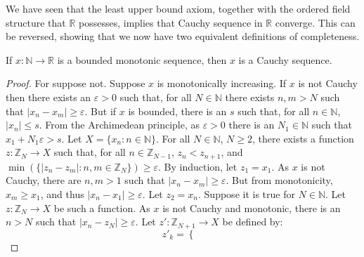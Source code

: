             We have seen that the least upper bound axiom,
            together with the ordered field structure that
            $\mathbb{R}$ possesses, implies that
            Cauchy sequence in $\mathbb{R}$ converge. This can
            be reversed, showing that we now have two equivalent
            definitions of completeness.
            \begin{theorem}
                If $x:\mathbb{N}\rightarrow\mathbb{R}$
                is a bounded monotonic sequence, then
                $x$ is a Cauchy sequence.
            \end{theorem}
            \begin{proof}
                For suppose not. Suppose $x$ is monotonically
                increasing. If $x$ is not Cauchy
                then there exists an $\varepsilon>0$ such
                that, for all $N\in\mathbb{N}$ there exists
                $n,m>N$ such that
                $|x_{n}-x_{m}|\geq\varepsilon$. But if
                $x$ is bounded, there is an $s$ such that,
                for all $n\in\mathbb{N}$, $|x_{n}|\leq{s}$.
                From the Archimedean principle, as
                $\varepsilon>0$ there is an $N_{1}\in\mathbb{N}$
                such that $x_{1}+N_{1}\varepsilon>s$.
                Let $X=\{x_{n}:n\in\mathbb{N}\}$.
                For all $N\in\mathbb{N}$, $N\geq{2}$,
                there exists a function
                $z:\mathbb{Z}_{N}\rightarrow{X}$ such that, for
                all $n\in\mathbb{Z}_{N-1}$,
                $z_{n}<z_{n+1}$, and
                $\min(\{|z_{n}-z_{m}|:n,m\in\mathbb{Z}_{N}\})%
                 \geq\varepsilon$. By induction,
                let $z_{1}=x_{1}$. As $x$ is not Cauchy, there
                are $n,m>1$ such that
                $|x_{n}-x_{m}|\geq\varepsilon$. But from
                monotonicity, $x_{m}\geq{x}_{1}$, and thus
                $|x_{n}-x_{1}|\geq\varepsilon$.
                Let $z_{2}=x_{n}$. Suppose it is true for
                $N\in\mathbb{N}$. Let
                $z:\mathbb{Z}_{N}\rightarrow{X}$ be such a
                function. As $x$ is not Cauchy and
                monotonic, there is an $n>N$ such that
                $|x_{n}-z_{N}|\geq\varepsilon$.
                Let $z':\mathbb{Z}_{N+1}\rightarrow{X}$
                be defined by:
                \begin{subequations}
                    \begin{equation}
                        z'_{k}=
                        \begin{cases}

\end{cases}
\end{equation}
\end{subequations}
\end{proof}
